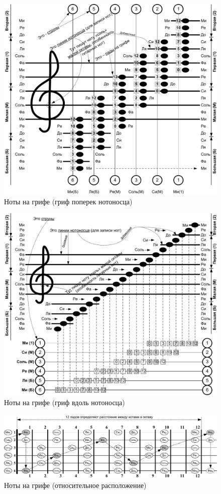 \begin{figure}[!ht]
    \centering
    \includegraphics[width=\textwidth]{fig/lad-by-notes} 
    \caption{Ноты на грифе (гриф поперек нотоносца)}\label{fig:guitar:lad-by-notes}
\end{figure} 

\begin{figure}[!ht]
    \centering
    \includegraphics[width=\textwidth]{fig/lad-by-griph} 
    \caption{Ноты на грифе (гриф вдоль нотоносца)}\label{fig:guitar:lad-by-griph}
\end{figure} 

\begin{figure}[!ht]
    \centering
    \includegraphics[width=\textwidth]{fig/notes-on-griph} 
    \caption{Ноты на грифе (относительное расположение)}\label{fig:guitar:notes-on-griph}
\end{figure} 


